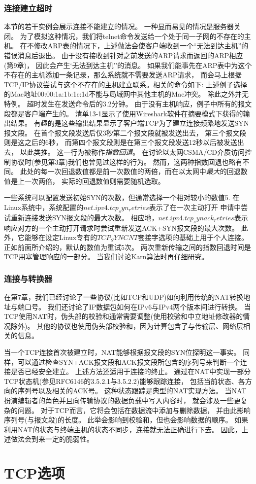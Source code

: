 \documentclass{../main.tex}{subfiles}
\begin{document}
\subsubsection{连接建立超时}
本节的若干实例会展示连接不能建立的情况。
一种显而易见的情况是服务器关闭。
为了模拟这种情况，我们将telnet命令发送给一个处于同一子网的不存在的主机。
在不修改ARP表的情况下，上述做法会使客户端收到一个``无法到达主机''的错误消息后退出。
由于没有接收到针对之前发送的ARP请求而返回的ARP相应(第9章)，
因此会产生`无法到达主机''的消息。
如果我们能事先在ARP表中为这个不存在的主机添加一条记录，那么系统就不需要发送ARP请求，
而会马上根据TCP/IP协议尝试与这个不存在的主机建立联系。相关的命令如下:
上述例子选择的Mac地址00:00:1a:1b:1c:1d不能与局域网中其他主机的Mac冲突。
除此之外并无特例。
超时发生在发送命令后的3.2分钟。
由于没有主机响应，例子中所有的报文段都是客户端产生的。
清单13-1显示了使用Wireshark软件在摘要模式下获得的输出结果。
有趣的是这些输出结果显示了客户端TCP为了建立连接频繁地发送SYN报文段。
在首个报文段发送后仅3秒第二个报文段就被发送出去，
第三个报文段则是这之后的6秒，
而第四个报文段则是在第三个报文段发送12秒以后被发送出去，
以此类推。
这一行为被称作\emph{指数回退}。
在讨论以太网CSMA/CD介质访问控制协议时(参见第3章)我们也曾见过这样的行为。
然而，这两种指数回退也略有不同。
此处的每一次回退数值都是前一次数值的两倍，而在以太网中\emph{最大}的回退数值是上一次两倍，
实际的回退数值则需要随机选取。

一些系统可以配置发送初始SYN的次数，但通常选择一个相对较小的数值5.
在Linux系统中，系统配置的$net.ipv4.tcp_syn_retries$表示了在一次主动打开
申请中尝试重新连接发送SYN报文段的最大次数。
相应地，$net.ipv4.tcp_synack_retries$表示响应对方的一个主动打开请求时尝试重新发送ACK+SYN报文段的最大次数。
此外，它能够在设定Linux专有的$TCP_SYNCNT$套接字选项的基础上用于个人连接。
正如前面所介绍的，默认的数值为重试5次。
两次重新传输之间的指数回退时间是TCP用塞管理响应的一部分。
当我们讨论Karn算法时再仔细研究。

\subsubsection{连接与转换器}
在第7章，我们已经讨论了一些协议(比如TCP和UDP)如何利用传统的NAT转换地址与端口号。
我们还讨论了IP数据包如何在IPv6与IPv4两个版本间进行转换。
当TCP使用NAT时，伪头部的校验和通常需要调整(使用校验和中立地址修改器的情况除外)。
其他的协议也使用伪头部校验和，因为计算包含了与传输层、网络层相关的信息。

当一个TCP连接首次被建立时，NAT能够根据报文段的SYN位探明这一事实。
同样，可以通过检查SYN+ACK报文段和ACK报文段所包含的序列号来判断一个连接是否已经安全建立。
上述方法还适用于连接的终止。
通过在NAT中实现一部分TCP状态机(参见RFC6146的3.5.2.1与3.5.2.2)能够跟踪连接，
包括当前状态、各方向的序列号以及相关的ACK号。
这种状态跟踪是典型的NAT实现方法。
当NAT扮演编辑者的角色并且向传输协议的数据负载中写入内容时，
就会涉及一些更复杂的问题。
对于TCP而言，它将会包括在数据流中添加与删除数据，
并由此影响序列号(与报文段)的长度。
此举会影响到校验和，但也会影响数据的顺序。
如果利用NAT的状态与终端主机的状态不同步，连接就无法正确进行下去。
因此，上述做法会到来一定的脆弱性。

\section{TCP选项}
\end{document}
